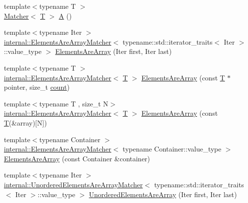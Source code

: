 \begin{DoxyCompactItemize}
\item 
{\footnotesize template$<$typename T $>$ }\\\hyperlink{classtesting_1_1_matcher}{Matcher}$<$ \hyperlink{functions__7_8js_adf1f3edb9115acb0a1e04209b7a9937b}{T} $>$ \hyperlink{namespacetesting_a5e9134d655d2fc9323902348083282e7}{A} ()
\item 
{\footnotesize template$<$typename Iter $>$ }\\\hyperlink{classtesting_1_1internal_1_1_elements_are_array_matcher}{internal\+::\+Elements\+Are\+Array\+Matcher}$<$ typename\+::std\+::iterator\+\_\+traits$<$ Iter $>$\+::value\+\_\+type $>$ \hyperlink{namespacetesting_ae2eee06e7ddbf5f5372fd24372e9703f}{Elements\+Are\+Array} (Iter first, Iter last)
\item 
{\footnotesize template$<$typename T $>$ }\\\hyperlink{classtesting_1_1internal_1_1_elements_are_array_matcher}{internal\+::\+Elements\+Are\+Array\+Matcher}$<$ \hyperlink{functions__7_8js_adf1f3edb9115acb0a1e04209b7a9937b}{T} $>$ \hyperlink{namespacetesting_abf5c2219b4e6a7542368b5f68eadd007}{Elements\+Are\+Array} (const \hyperlink{functions__7_8js_adf1f3edb9115acb0a1e04209b7a9937b}{T} $\ast$pointer, size\+\_\+t \hyperlink{gmock__stress__test_8cc_afd9db40e3361ae09188795e8cbe19752}{count})
\item 
{\footnotesize template$<$typename T , size\+\_\+t N$>$ }\\\hyperlink{classtesting_1_1internal_1_1_elements_are_array_matcher}{internal\+::\+Elements\+Are\+Array\+Matcher}$<$ \hyperlink{functions__7_8js_adf1f3edb9115acb0a1e04209b7a9937b}{T} $>$ \hyperlink{namespacetesting_ac5895c9867d6b976351446a043dcdd66}{Elements\+Are\+Array} (const \hyperlink{functions__7_8js_adf1f3edb9115acb0a1e04209b7a9937b}{T}(\&array)\mbox{[}N\mbox{]})
\item 
{\footnotesize template$<$typename Container $>$ }\\\hyperlink{classtesting_1_1internal_1_1_elements_are_array_matcher}{internal\+::\+Elements\+Are\+Array\+Matcher}$<$ typename Container\+::value\+\_\+type $>$ \hyperlink{namespacetesting_ad257747adbe056feaa92f449063d681f}{Elements\+Are\+Array} (const Container \&container)
\item 
{\footnotesize template$<$typename Iter $>$ }\\\hyperlink{classtesting_1_1internal_1_1_unordered_elements_are_array_matcher}{internal\+::\+Unordered\+Elements\+Are\+Array\+Matcher}$<$ typename\+::std\+::iterator\+\_\+traits$<$ Iter $>$\+::value\+\_\+type $>$ \hyperlink{namespacetesting_ab4896081406209171a1596b7028e1cf7}{Unordered\+Elements\+Are\+Array} (Iter first, Iter last)

\end{DoxyCompactItemize}

